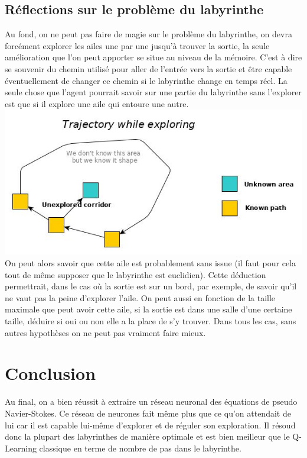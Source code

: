 \documentclass[10pt]{article}
\begin{document}
\subsection{Réflections sur le problème du labyrinthe}
Au fond, on ne peut pas faire de magie sur le problème du labyrinthe, on devra forcément explorer les ailes une par une jusqu'à trouver la sortie, la seule amélioration que l'on peut apporter se situe au niveau de la mémoire. C'est à dire se souvenir du chemin utilisé pour aller de l'entrée vers la sortie et être capable éventuellement de changer ce chemin si le labyrinthe change en temps réel. La seule chose que l'agent pourrait savoir sur une partie du labyrinthe sans l'explorer est que si il explore une aile qui entoure une autre.
\includegraphics[scale=0.5]{ex_shape.jpg}\\
On peut alors savoir que cette aile est probablement sans issue (il faut pour cela tout de même supposer que le labyrinthe est euclidien). Cette déduction permettrait, dans le cas où la sortie est sur un bord, par exemple, de savoir qu'il ne vaut pas la peine d'explorer l'aile. On peut aussi en fonction de la taille maximale que peut avoir cette aile, si la sortie est dans une salle d'une certaine taille, déduire si oui ou non elle a la place de s'y trouver. Dans tous les cas, sans autres hypothèses on ne peut pas vraiment faire mieux.

\section{Conclusion}
Au final, on a bien réussit à extraire un réseau neuronal des équations de pseudo Navier-Stokes. Ce réseau de neurones fait même plus que ce qu'on attendait de lui car il est capable lui-même d'explorer et de réguler son exploration. Il résoud donc la plupart des labyrinthes de manière optimale et est bien meilleur que le Q-Learning classique en terme de nombre de pas dans le labyrinthe.
\end{document}
